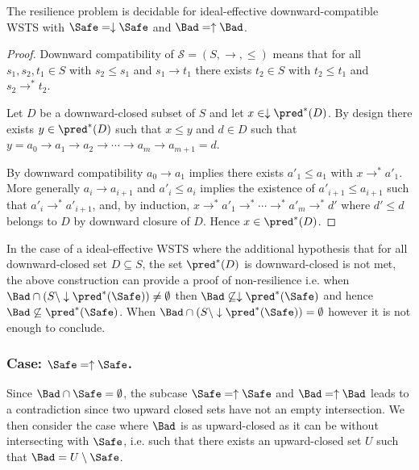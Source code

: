 \begin{corollary}
The resilience problem is decidable for ideal-effective downward-compatible WSTS with 
$\Safe=\downarrow \Safe$
and $\Bad=\uparrow \Bad$.
\end{corollary}

\begin{proof}
Downward compatibility of $\mathscr{S}=(S,\rightarrow, \leq)$ 
means that
for all $s_1, s_2, t_1 \in S$ with
$s_2 \leq s_1$ and $s_1 \to t_1$
there
exists $t_2 \in S$ with
$t_2 \leq t_1$ and $s_2 \to^* t_2$.

Let $D$ be a downward-closed subset of $S$
and let $x \in \downarrow \pred^*(D)$.
By design  there exists
$y \in \pred^*(D)$ 
such that $x \leq y$
and $d \in D$ such that
$y = a_0 \to a_1 \to a_2 \to \cdots \to a_m \to a_{m+1} = d$.

By downward compatibility $a_0 \to a_1$
implies there exists $a'_1 \leq a_1$ with
$x \to^* a'_1$.
More generally $a_i \to a_{i+1}$ and
$a'_i\leq a_i$ implies the existence of $a'_{i+1} \leq a_{i+1}$ such that
$a'_i \to^* a'_{i+1}$,
and, by induction,
 $x \to^* a'_1 \to^* \cdots \to^* a'_{m} \to^* d'$
where
$d' \leq d$ belongs to $D$ by downward closure of $D$.
Hence $x \in \pred^*(D)$.
\end{proof}

In the case
of a ideal-effective WSTS 
where
the additional hypothesis that
for all downward-closed set $D \subseteq S$, the set $\pred^*(D)$ is downward-closed
is not met,
the above construction
can provide a proof
of non-resilience
i.e. when
$\Bad \cap (S \setminus \downarrow\pred^*(\Safe)) \neq \emptyset$
then
$\Bad \not\subseteq \downarrow\pred^*(\Safe)$
and hence
$\Bad \not\subseteq \pred^*(\Safe)$.
When $\Bad \cap (S \setminus \downarrow\pred^*(\Safe)) = \emptyset$
however
it is not enough to conclude.



\subsubsection{Case: $\Safe=\uparrow \Safe$.}


Since $\Bad \cap \Safe = \emptyset$, the subcase $\Safe = \uparrow \Safe$ and $\Bad = \uparrow \Bad$ leads to a contradiction since two upward closed sets have not an empty intersection. We then consider the case where $\Bad$ is as upward-closed
as it can be without intersecting with $\Safe$,
i.e. 
such that there exists an upward-closed set $U$
such that $\Bad = U \setminus \Safe$.

